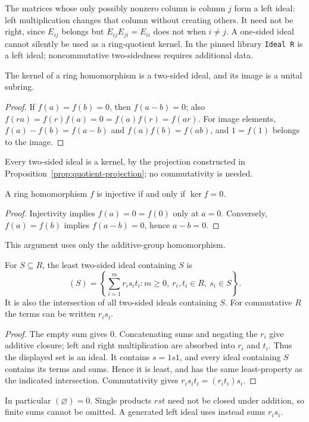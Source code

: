 The matrices whose only possibly nonzero column is column $j$ form a
left ideal: left multiplication changes that column without creating
others. It need not be right, since $E_{ij}$ belongs but
$E_{ij}E_{ji}=E_{ii}$ does not when $i\ne j$. A one-sided ideal cannot
silently be used as a ring-quotient kernel. In the pinned library
\texttt{Ideal R} is a left ideal; noncommutative two-sidedness requires
additional data.

\begin{proposition}\label{prop:ring-kernel-image}
The kernel of a ring homomorphism is a two-sided ideal, and its image is
a unital subring.
\end{proposition}
\begin{proof}
If $f(a)=f(b)=0$, then $f(a-b)=0$; also
$f(ra)=f(r)f(a)=0=f(a)f(r)=f(ar)$.
For image elements, $f(a)-f(b)=f(a-b)$ and $f(a)f(b)=f(ab)$,
and $1=f(1)$ belongs to the image.
\end{proof}
Every two-sided ideal is a kernel, by the projection constructed in
Proposition~\ref{prop:quotient-projection}; no commutativity is needed.

\begin{proposition}\label{prop:ring-zero-kernel}
A ring homomorphism $f$ is injective if and only if $\ker f=0$.
\end{proposition}
\begin{proof}
Injectivity implies $f(a)=0=f(0)$ only at $a=0$. Conversely,
$f(a)=f(b)$ implies $f(a-b)=0$, hence $a-b=0$.
\end{proof}
This argument uses only the additive-group homomorphism.

\begin{proposition}\label{prop:ideal-span}
For $S\subseteq R$, the least two-sided ideal containing $S$ is
\[
 (S)=\left\{\sum_{i=1}^m r_i s_i t_i:
 m\ge0,\ r_i,t_i\in R,\ s_i\in S\right\}.
\]
It is also the intersection of all two-sided ideals containing $S$.
For commutative $R$ the terms can be written $r_i s_i$.
\end{proposition}
\begin{proof}
The empty sum gives $0$. Concatenating sums and negating the $r_i$
give additive closure; left and right multiplication are absorbed into
$r_i$ and $t_i$. Thus the displayed set is an ideal. It contains
$s=1s1$, and every ideal containing $S$ contains its terms and sums.
Hence it is least, and has the same least-property as the indicated
intersection. Commutativity gives $r_i s_i t_i=(r_i t_i)s_i$.
\end{proof}
In particular $(\varnothing)=0$. Single products $rst$ need not be closed
under addition, so finite sums cannot be omitted. A generated left ideal
uses instead sums $r_i s_i$.

